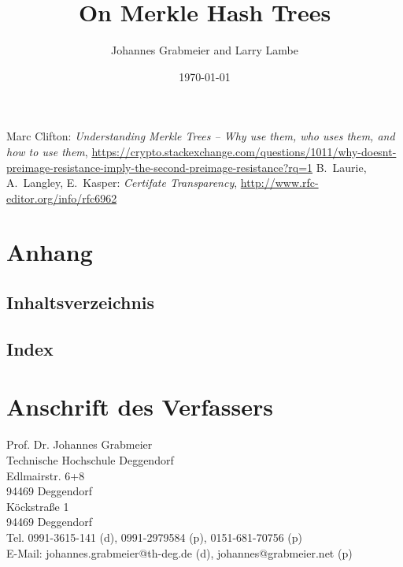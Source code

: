 
%

\makeindex

 
\title{
On Merkle Hash Trees
}

\author{%
Johannes Grabmeier and Larry Lambe
}
\date{\today} %
\maketitle




\begin{thebibliography}{1}

 Marc Clifton:
	{\em Understanding Merkle Trees -- Why use them, who uses them, and 
	how to use them}, 
	\url{https://crypto.stackexchange.com/questions/1011/why-doesnt-preimage-resistance-imply-the-second-preimage-resistance?rq=1}
 B.~Laurie, A.~Langley, E.~Kasper: {\em Certifate Transparency}, 
	\url{http://www.rfc-editor.org/info/rfc6962}

\end{thebibliography}

\newpage
\section{Anhang}
\subsection{Inhaltsverzeichnis}
\tableofcontents
\subsection{Index}

\section*{Anschrift des Verfassers}
Prof. Dr. Johannes Grabmeier \\
Technische Hochschule Deggendorf \\ Edlmairstr. 6+8\\ 94469 Deggendorf \\
Köckstraße 1 \\ 94469 Deggendorf \\
Tel. 0991-3615-141 (d), 0991-2979584 (p), 0151-681-70756 (p)\\
E-Mail: johannes.grabmeier@th-deg.de (d), johannes@grabmeier.net (p)

